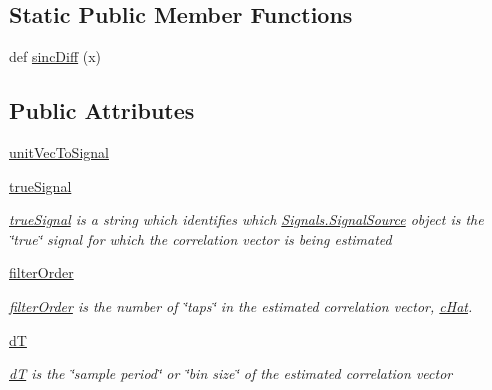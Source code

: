 \subsection*{Static Public Member Functions}
\begin{DoxyCompactItemize}
\item 
def \hyperlink{classSignalCorrelationSubstate_1_1CorrelationFilter_a948d71970965e18ecc2f19c3bc49f7f7}{sinc\+Diff} (x)
\end{DoxyCompactItemize}
\subsection*{Public Attributes}
\begin{DoxyCompactItemize}
\item 
\hyperlink{classSignalCorrelationSubstate_1_1CorrelationFilter_ac1cfe7d60893f6a9e174a775be166fd6}{unit\+Vec\+To\+Signal}
\item 
\hyperlink{classSignalCorrelationSubstate_1_1CorrelationFilter_a67ff75effd8a8a7e34f0f3e8c56ef491}{true\+Signal}
\begin{DoxyCompactList}\small\item\em \hyperlink{classSignalCorrelationSubstate_1_1CorrelationFilter_a67ff75effd8a8a7e34f0f3e8c56ef491}{true\+Signal} is a string which identifies which \hyperlink{classSignals_1_1SignalSource}{Signals.\+Signal\+Source} object is the \char`\"{}true\char`\"{} signal for which the correlation vector is being estimated \end{DoxyCompactList}\item 
\hyperlink{classSignalCorrelationSubstate_1_1CorrelationFilter_a4b49b7bd52c1346cca0342942a5bbbb6}{filter\+Order}
\begin{DoxyCompactList}\small\item\em \hyperlink{classSignalCorrelationSubstate_1_1CorrelationFilter_a4b49b7bd52c1346cca0342942a5bbbb6}{filter\+Order} is the number of \char`\"{}taps\char`\"{} in the estimated correlation vector, \hyperlink{classSignalCorrelationSubstate_1_1CorrelationFilter_ad07b1d484b9ab77a1a8fc215f10faf15}{c\+Hat}. \end{DoxyCompactList}\item 
\hyperlink{classSignalCorrelationSubstate_1_1CorrelationFilter_a500e4823c314d54a21f236b6b896c8eb}{dT}
\begin{DoxyCompactList}\small\item\em \hyperlink{classSignalCorrelationSubstate_1_1CorrelationFilter_a500e4823c314d54a21f236b6b896c8eb}{dT} is the \char`\"{}sample period\char`\"{} or \char`\"{}bin size\char`\"{} of the estimated correlation vector \end{DoxyCompactList}\item 

\end{DoxyCompactItemize}
